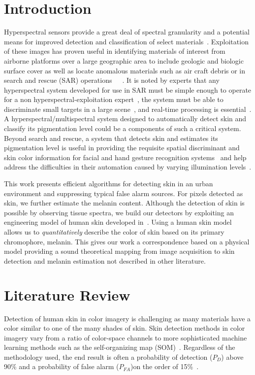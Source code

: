 \documentclass[10pt,journal,cspaper,compsoc]{IEEEtran}
\begin{document}
\section{Introduction}\label{sec:introduction}
Hyperspectral sensors provide a great deal of spectral granularity and a potential means for improved detection and classification of select 
materials~\cite{Manolakis1}. Exploitation of these images has proven useful in identifying materials of interest from airborne 
platforms over a large geographic area to include geologic and biologic surface cover as well as locate anomalous materials such 
as air craft debris or in search and rescue (SAR) operations~\cite{Subramanian1}~\cite{Topping1}~\cite{Simard1}. 
It is noted by experts that any hyperspectral system developed for use in SAR must be simple enough to operate for a non hyperspectral-exploitation 
expert~\cite{Stevenson1}, the system must be able to discriminate small targets in a large scene~\cite{Leonard1}, and real-time processing 
is essential~\cite{Simi1}.  A hyperspectral/multispectral system designed to automatically detect skin and classify its pigmentation level could be 
a components of such a critical system.  Beyond search and rescue, a system that detects skin and estimates its pigmentation level 
is useful in providing the requisite spatial discriminant and skin color information for facial and hand gesture recognition systems~\cite{Pan1, Yang1, Sanchez1}
and help address the difficulties in their automation caused by varying illumination levels~\cite{Daugman1}.

This work presents efficient algorithms for detecting skin in an urban environment and suppressing typical false alarm sources.  
For pixels detected as skin, we further estimate the melanin content. Although the detection of skin is possible by observing tissue 
spectra, we build our detectors by exploiting an engineering model of human skin developed in~\cite{Nunez8}.  Using a human skin model allows 
us to \emph{quantitatively} describe the color of skin based on its primary chromophore, melanin.  This gives our work a correspondence 
based on a physical model providing a sound theoretical mapping from image acquisition to skin detection and melanin estimation not described 
in other literature.

\section{Literature Review}
\label{scn:lit_review}
Detection of human skin in color imagery is challenging as many materials have a color similar to one of the many shades of skin.  
Skin detection methods in color imagery vary from a ratio of color-space channels to more sophisticated machine learning methods such as the 
self-organizing map (SOM)~\cite{Vezhnevets1}. Regardless of the methodology used, the end result is often a probability 
of detection ($P_D$) above 90\% and a probability of false alarm ($P_{FA}$)on the order of 15\%~\cite{Brand1}.
\end{document}
